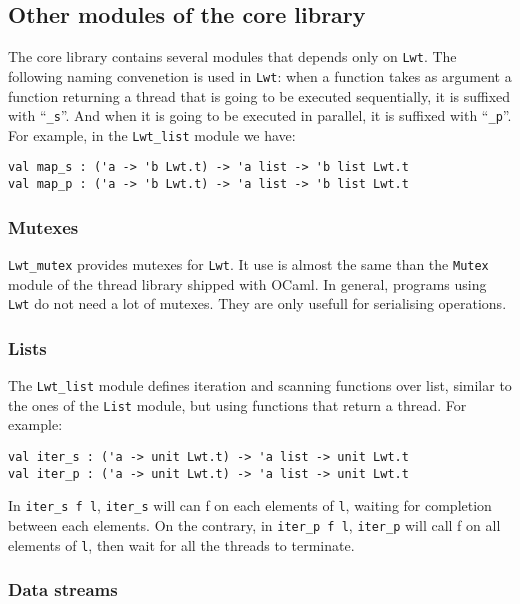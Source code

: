 \documentclass{article}
\newcommand{\lwt}{\texttt{Lwt}\xspace}
\begin{document}
\subsection{Other modules of the core library}

The core library contains several modules that depends only on
\lwt. The following naming convenetion is used in \lwt: when a
function takes as argument a function returning a thread that is going
to be executed sequentially, it is suffixed with ``\texttt{\_s}''. And
when it is going to be executed in parallel, it is suffixed with
``\texttt{\_p}''. For example, in the \texttt{Lwt\_list} module we have:

\begin{verbatim}
val map_s : ('a -> 'b Lwt.t) -> 'a list -> 'b list Lwt.t
val map_p : ('a -> 'b Lwt.t) -> 'a list -> 'b list Lwt.t
\end{verbatim}

\subsubsection{Mutexes}

\texttt{Lwt\_mutex} provides mutexes for \lwt. It use is almost the
same than the \texttt{Mutex} module of the thread library shipped with
OCaml. In general, programs using \lwt do not need a lot of
mutexes. They are only usefull for serialising operations.

\subsubsection{Lists}

The \texttt{Lwt\_list} module defines iteration and scanning functions
over list, similar to the ones of the \texttt{List} module, but using
functions that return a thread. For example:

\begin{verbatim}
val iter_s : ('a -> unit Lwt.t) -> 'a list -> unit Lwt.t
val iter_p : ('a -> unit Lwt.t) -> 'a list -> unit Lwt.t
\end{verbatim}

In \texttt{iter\_s f l}, \texttt{iter\_s} will can f on each elements
of \texttt{l}, waiting for completion between each elements. On the
contrary, in \texttt{iter\_p f l}, \texttt{iter\_p} will call f on all
elements of \texttt{l}, then wait for all the threads to terminate.

\subsubsection{Data streams}
\end{document}
